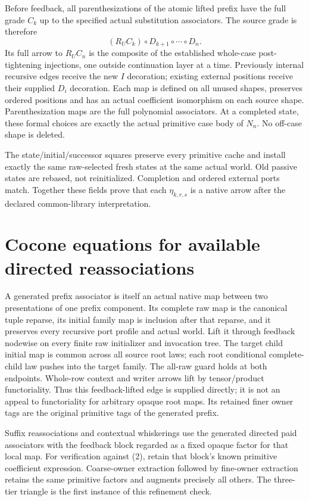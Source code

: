 \documentclass[11pt]{article}\usepackage{amsmath,amssymb,amsthm,geometry}\geometry{margin=1in}\newtheorem{definition}{Definition}\newtheorem{theorem}[definition]{Theorem}
\begin{document}
Before feedback, all parenthesizations of the atomic lifted prefix have the full grade $C_k$ up to the specified actual substitution associators. The source grade is therefore
\[
              (R_UC_k)\circ D_{k+1}\circ\cdots\circ D_n.
\]
Its full arrow to $R_UC_n$ is the composite of the established whole-case post-tightening injections, one outside continuation layer at a time. Previously internal recursive edges receive the new $I$ decoration; existing external positions receive their supplied $D_i$ decoration. Each map is defined on all unused shapes, preserves ordered positions and has an actual coefficient isomorphism on each source shape. Parenthesization maps are the full polynomial associators. At a completed state, these formal choices are exactly the actual primitive case body of $N_n$. No off-case shape is deleted.

The state/initial/successor squares preserve every primitive cache and install exactly the same raw-selected fresh states at the same actual world. Old passive states are rebased, not reinitialized. Completion and ordered external ports match. Together these fields prove that each $\eta_{k,r,s}$ is a native arrow after the declared common-library interpretation.

\section{Cocone equations for available directed reassociations}
A generated prefix associator is itself an actual native map between two presentations of one prefix component. Its complete raw map is the canonical tuple reparse, its initial family map is inclusion after that reparse, and it preserves every recursive port profile and actual world. Lift it through feedback nodewise on every finite raw initializer and invocation tree. The target child initial map is common across all source root laws; each root conditional complete-child law pushes into the target family. The all-raw guard holds at both endpoints. Whole-row context and writer arrows lift by tensor/product functoriality. Thus this feedback-lifted edge is supplied directly; it is not an appeal to functoriality for arbitrary opaque root maps. Its retained finer owner tags are the original primitive tags of the generated prefix.

Suffix reassociations and contextual whiskerings use the generated directed paid associators with the feedback block regarded as a fixed opaque factor for that local map. For verification against (2), retain that block's known primitive coefficient expression. Coarse-owner extraction followed by fine-owner extraction retains the same primitive factors and augments precisely all others. The three-tier triangle is the first instance of this refinement check.
\end{document}
